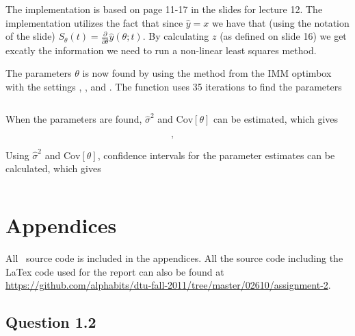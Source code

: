 

The implementation is based on page 11-17 in the slides for lecture 12. The implementation utilizes the fact that since $\hat{y}=x$ we have that (using the notation of the slide) $S_\theta(t) = \frac{\partial}{\partial\theta}\hat{y}(\theta; t)$. By calculating $z$ (as defined on slide 16) we get excatly the information we need to run a non-linear least squares method.

The parameters $\theta$ is now found by using the  method from the IMM optimbox with the settings , ,  and . The function uses 35 iterations to find the parameters

\begin{equation*}
    
\end{equation*}

When the parameters are found, $\hat{\sigma}^2$ and $\text{Cov}[\theta]$ can be estimated, which gives

\begin{equation*}
    , \quad 
\end{equation*}

Using $\hat{\sigma}^2$ and $\text{Cov}[\theta]$, confidence intervals for the parameter estimates can be calculated, which gives

\begin{equation*}
    
\end{equation*}


\pagebreak
\renewcommand\thesection{\Alph{section}}


\section{Appendices}

All \matlab\ source code is included in the appendices. All the source code
including the LaTex code used for the report can also be found at
\url{https://github.com/alphabits/dtu-fall-2011/tree/master/02610/assignment-2}.

\subsection{Question 1.2}\label{app:ex12}



